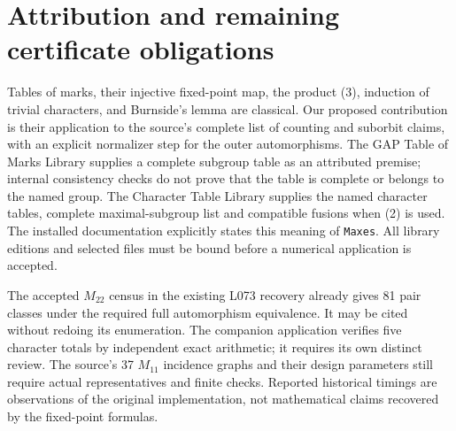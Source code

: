 \documentclass[11pt]{article}
\begin{document}
\section{Attribution and remaining certificate obligations}
Tables of marks, their injective fixed-point map, the product (3),
induction of trivial characters, and Burnside's lemma are classical.
Our proposed contribution is their application to the source's complete
list of counting and suborbit claims, with an explicit normalizer step
for the outer automorphisms. The GAP Table of Marks Library supplies a
complete subgroup table as an attributed premise; internal consistency
checks do not prove that the table is complete or belongs to the named
group. The Character Table Library supplies the named character tables,
complete maximal-subgroup list and compatible fusions when (2) is used.
The installed documentation explicitly states this meaning of
\texttt{Maxes}. All library editions and selected files must be bound
before a numerical application is accepted.

The accepted $M_{22}$ census in the existing L073 recovery already gives
81 pair classes under the required full automorphism equivalence. It
may be cited without redoing its enumeration. The companion application verifies five character totals by independent
exact arithmetic; it requires its own distinct review. The source's 37 $M_{11}$
incidence graphs and their design parameters still require actual
representatives and finite checks. Reported historical timings are
observations of the original implementation, not mathematical claims
recovered by the fixed-point formulas.
\end{document}
